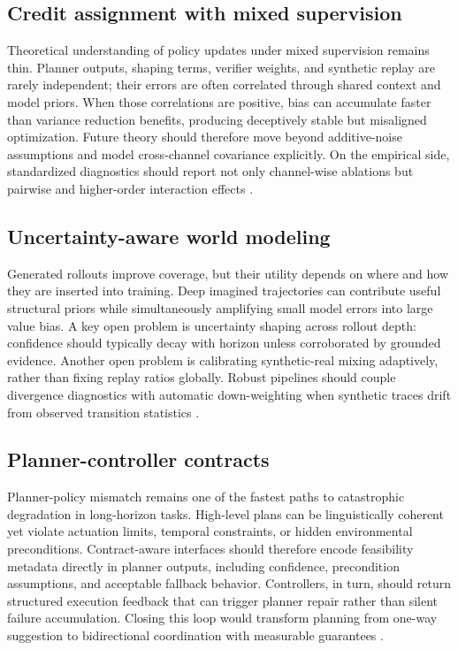 ﻿\documentclass[conference]{IEEEtran}
\begin{document}
\subsection{Credit assignment with mixed supervision}
Theoretical understanding of policy updates under mixed supervision remains thin. Planner outputs, shaping terms, verifier weights, and synthetic replay are rarely independent; their errors are often correlated through shared context and model priors. When those correlations are positive, bias can accumulate faster than variance reduction benefits, producing deceptively stable but misaligned optimization. Future theory should therefore move beyond additive-noise assumptions and model cross-channel covariance explicitly. On the empirical side, standardized diagnostics should report not only channel-wise ablations but pairwise and higher-order interaction effects \cite{arxiv_p_2510_20867,arxiv_p_2602_16165,arxiv_p_2601_06845}.

\subsection{Uncertainty-aware world modeling}
Generated rollouts improve coverage, but their utility depends on where and how they are inserted into training. Deep imagined trajectories can contribute useful structural priors while simultaneously amplifying small model errors into large value bias. A key open problem is uncertainty shaping across rollout depth: confidence should typically decay with horizon unless corroborated by grounded evidence. Another open problem is calibrating synthetic-real mixing adaptively, rather than fixing replay ratios globally. Robust pipelines should couple divergence diagnostics with automatic down-weighting when synthetic traces drift from observed transition statistics \cite{arxiv_p_2301_12050,arxiv_p_2602_02454,arxiv_p_2602_11075,arxiv_p_2602_00785}.

\subsection{Planner-controller contracts}
Planner-policy mismatch remains one of the fastest paths to catastrophic degradation in long-horizon tasks. High-level plans can be linguistically coherent yet violate actuation limits, temporal constraints, or hidden environmental preconditions. Contract-aware interfaces should therefore encode feasibility metadata directly in planner outputs, including confidence, precondition assumptions, and acceptable fallback behavior. Controllers, in turn, should return structured execution feedback that can trigger planner repair rather than silent failure accumulation. Closing this loop would transform planning from one-way suggestion to bidirectional coordination with measurable guarantees \cite{arxiv_p_2204_01691,arxiv_p_2405_01534,arxiv_p_2512_12716,arxiv_p_2602_16165}.
\end{document}
